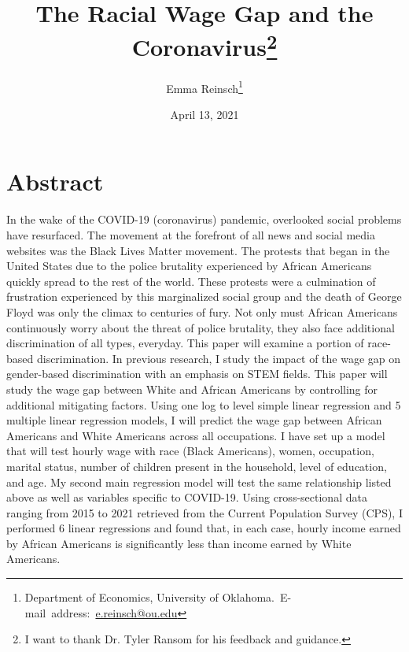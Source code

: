 \documentclass[12pt, english]{article}
\begin{document}
\begin{doublespace}
\title{The Racial Wage Gap and the Coronavirus\thanks{I want to thank Dr. Tyler Ransom for his feedback and guidance.}}
\end{doublespace}
\author{Emma Reinsch\thanks{Department of Economics, University of Oklahoma.\
E-mail~address:~\href{mailto:e.reinsch@ou.edu}{e.reinsch@ou.edu}}}

\date{April 13, 2021}


\maketitle
\section{Abstract}


In the wake of the COVID-19 (coronavirus) pandemic, overlooked social problems have resurfaced. The movement at the forefront of all news and social media websites was the Black Lives Matter movement. The protests that began in the United States due to the police brutality experienced by African Americans quickly spread to the rest of the world. These protests were a culmination of frustration experienced by this marginalized social group and the death of George Floyd was only the climax to centuries of fury. Not only must African Americans continuously worry about the threat of police brutality, they also face additional discrimination of all types, everyday. This paper will examine a portion of race-based discrimination. In previous research, I study the impact of the wage gap on gender-based discrimination with an emphasis on STEM fields. This paper will study the wage gap between White and African Americans by controlling for additional mitigating factors. Using one log to level simple linear regression and 5 multiple linear regression models, I will predict the wage gap between African Americans and White Americans across all occupations. I have set up a model that will test hourly wage with race (Black Americans), women, occupation, marital status, number of children present in the household, level of education, and age. My second main regression model will test the same relationship listed above as well as variables specific to COVID-19. Using cross-sectional data ranging from 2015 to 2021 retrieved from the Current Population Survey (CPS), I performed 6 linear regressions and found that, in each case, hourly income earned by African Americans is significantly less than income earned by White Americans.
\end{document}
